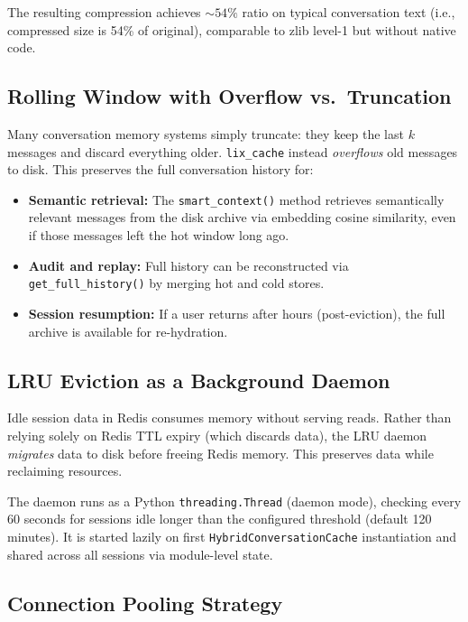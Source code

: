 \documentclass[conference]{IEEEtran}
\begin{document}
The resulting compression achieves ${\sim}54\%$ ratio on typical conversation text (i.e., compressed size is 54\% of original), comparable to zlib level-1 but without native code.

\subsection{Rolling Window with Overflow vs.\ Truncation}

Many conversation memory systems simply truncate: they keep the last $k$ messages and discard everything older. \texttt{lix\_cache} instead \emph{overflows} old messages to disk. This preserves the full conversation history for:

\begin{itemize}
\item \textbf{Semantic retrieval:} The \texttt{smart\_context()} method retrieves semantically relevant messages from the disk archive via embedding cosine similarity, even if those messages left the hot window long ago.
\item \textbf{Audit and replay:} Full history can be reconstructed via \texttt{get\_full\_history()} by merging hot and cold stores.
\item \textbf{Session resumption:} If a user returns after hours (post-eviction), the full archive is available for re-hydration.
\end{itemize}

\subsection{LRU Eviction as a Background Daemon}

Idle session data in Redis consumes memory without serving reads. Rather than relying solely on Redis TTL expiry (which discards data), the LRU daemon \emph{migrates} data to disk before freeing Redis memory. This preserves data while reclaiming resources.

The daemon runs as a Python \texttt{threading.Thread} (daemon mode), checking every 60 seconds for sessions idle longer than the configured threshold (default 120 minutes). It is started lazily on first \texttt{HybridConversationCache} instantiation and shared across all sessions via module-level state.

\subsection{Connection Pooling Strategy}
\end{document}
